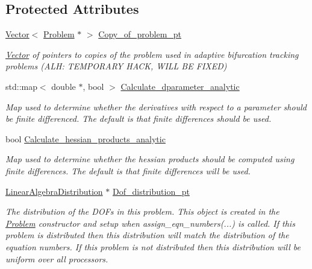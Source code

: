 \subsection*{Protected Attributes}
\begin{DoxyCompactItemize}
\item 
\hyperlink{classoomph_1_1Vector}{Vector}$<$ \hyperlink{classoomph_1_1Problem}{Problem} $\ast$ $>$ \hyperlink{classoomph_1_1Problem_aa2e04de221f29c13067e2fe4cf4c70f9}{Copy\+\_\+of\+\_\+problem\+\_\+pt}
\begin{DoxyCompactList}\small\item\em \hyperlink{classoomph_1_1Vector}{Vector} of pointers to copies of the problem used in adaptive bifurcation tracking problems (A\+LH\+: T\+E\+M\+P\+O\+R\+A\+RY H\+A\+CK, W\+I\+LL BE F\+I\+X\+ED) \end{DoxyCompactList}\item 
std\+::map$<$ double $\ast$, bool $>$ \hyperlink{classoomph_1_1Problem_a3f2b7c1d8e0086a316b7ec0cc2a63327}{Calculate\+\_\+dparameter\+\_\+analytic}
\begin{DoxyCompactList}\small\item\em Map used to determine whether the derivatives with respect to a parameter should be finite differenced. The default is that finite differences should be used. \end{DoxyCompactList}\item 
bool \hyperlink{classoomph_1_1Problem_ac353f1325a3b411b30fbc19314cc18ce}{Calculate\+\_\+hessian\+\_\+products\+\_\+analytic}
\begin{DoxyCompactList}\small\item\em Map used to determine whether the hessian products should be computed using finite differences. The default is that finite differences will be used. \end{DoxyCompactList}\item 
\hyperlink{classoomph_1_1LinearAlgebraDistribution}{Linear\+Algebra\+Distribution} $\ast$ \hyperlink{classoomph_1_1Problem_ade01b88db08dcec1706fe44eaa0090a3}{Dof\+\_\+distribution\+\_\+pt}
\begin{DoxyCompactList}\small\item\em The distribution of the D\+O\+Fs in this problem. This object is created in the \hyperlink{classoomph_1_1Problem}{Problem} constructor and setup when assign\+\_\+eqn\+\_\+numbers(...) is called. If this problem is distributed then this distribution will match the distribution of the equation numbers. If this problem is not distributed then this distribution will be uniform over all processors. \end{DoxyCompactList}\item 

\end{DoxyCompactItemize}
